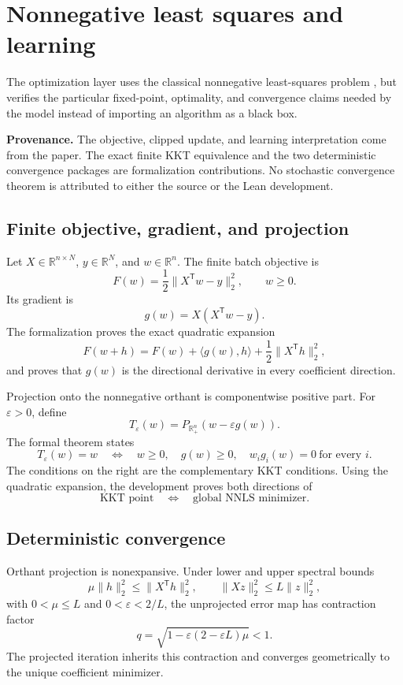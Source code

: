 \documentclass[11pt,a4paper]{article}
\begin{document}
\section{Nonnegative least squares and learning}
\label{sec:nnls}

The optimization layer uses the classical nonnegative least-squares problem
\cite{lawson1995}, but verifies the particular fixed-point, optimality, and
convergence claims needed by the model instead of importing an algorithm as
a black box.

\textbf{Provenance.} The objective, clipped update, and learning interpretation
come from the paper. The exact finite KKT equivalence and the two deterministic
convergence packages are formalization contributions. No stochastic convergence
theorem is attributed to either the source or the Lean development.

\subsection{Finite objective, gradient, and projection}

Let \(X\in\mathbb{R}^{n\times N}\), \(y\in\mathbb{R}^{N}\), and
\(w\in\mathbb{R}^n\). The finite batch objective is
\[
  F(w)=\frac12\|X^\mathsf{T}w-y\|_2^2,
  \qquad w\geq0.
\]
Its gradient is
\[
  g(w)=X(X^\mathsf{T}w-y).
\]
The formalization proves the exact quadratic expansion
\[
  F(w+h)=F(w)+\langle g(w),h\rangle+
  \frac12\|X^\mathsf{T}h\|_2^2,
\]
and proves that \(g(w)\) is the directional derivative in every coefficient
direction.

Projection onto the nonnegative orthant is componentwise positive part.
For \(\varepsilon>0\), define
\[
  T_\varepsilon(w)=
  P_{\mathbb{R}_+^n}(w-\varepsilon g(w)).
\]
The formal theorem states
\[
  T_\varepsilon(w)=w
  \quad\Longleftrightarrow\quad
  w\geq0,\quad g(w)\geq0,\quad
  w_i g_i(w)=0\ \text{for every }i.
\]
The conditions on the right are the complementary KKT conditions. Using the
quadratic expansion, the development proves both directions of
\[
  \text{KKT point}\quad\Longleftrightarrow\quad
  \text{global NNLS minimizer}.
\]

\subsection{Deterministic convergence}

Orthant projection is nonexpansive. Under lower and upper spectral bounds
\[
  \mu\|h\|_2^2
  \leq\|X^\mathsf{T}h\|_2^2,
  \qquad
  \|Xz\|_2^2\leq L\|z\|_2^2,
\]
with \(0<\mu\leq L\) and \(0<\varepsilon<2/L\), the unprojected error map has
contraction factor
\[
  q=\sqrt{1-\varepsilon(2-\varepsilon L)\mu}<1.
\]
The projected iteration inherits this contraction and converges
geometrically to the unique coefficient minimizer.
\end{document}
